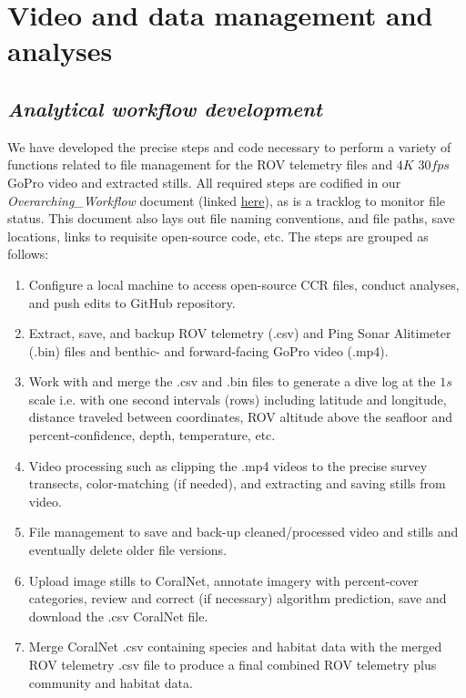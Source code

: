 \documentclass[11pt]{article}
\begin{document}
\section{Video and data management and analyses}
\label{Analyses}

\subsection{\textit{Analytical workflow development}}
We have developed the precise steps and code necessary to perform a 
variety of functions related to file management for the ROV telemetry 
files and $4K$ $30fps$ GoPro video and extracted stills. 
All required steps are codified in our \textit{Overarching\_Workflow} 
document (linked 
\href{https://github.com/zhrandell/Seattle_Aquarium_ROV_telemetry_imagery_analysis/blob/main/documents/Overarching_Workflow.xlsx}{here}),
 as is a tracklog to monitor file status. 
This document also lays out file naming conventions, and file paths, 
save locations, links to requisite open-source code, etc. 
The steps are grouped as follows:

\begin{enumerate}[label=\textbf{\Alph*}:]
\item 
Configure a local machine to access open-source CCR 
files, conduct analyses, and push edits to GitHub repository.
\item 
Extract, save, and backup ROV telemetry (.csv) and Ping Sonar 
Alitimeter (.bin) files and benthic- and forward-facing GoPro video 
(.mp4). 
\item
Work with and merge the .csv and .bin files to 
generate a dive log at the $1s$ scale i.e. with one second intervals 
(rows) including latitude and longitude, distance traveled between 
coordinates, ROV altitude above the seafloor and percent-confidence, 
depth, temperature, etc.
\item
Video processing such as clipping the .mp4 videos to the precise survey
transects, color-matching (if needed), and extracting and saving stills 
from video.
\item 
File management to save and back-up cleaned/processed video and stills 
and eventually delete older file versions. 
\item Upload image stills to CoralNet, annotate imagery 
with percent-cover categories, review and correct (if necessary) 
algorithm prediction, save and download the .csv CoralNet file.
 \item 
Merge CoralNet .csv containing species and habitat data 
with the merged ROV telemetry .csv file to produce a final combined ROV 
telemetry plus community and habitat data. 
\end{enumerate}
\end{document}
